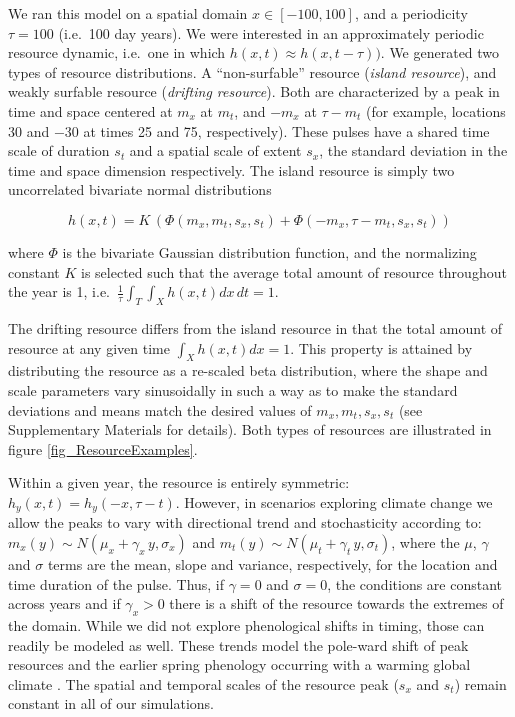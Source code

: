 \documentclass[utf8]{frontiersSCNS} %
\begin{document}
	We ran this model on a spatial domain $x \in [-100,100]$, and a periodicity $\tau = 100$ (i.e.~100 day years). We were interested in an approximately periodic resource dynamic, i.e.~one in which $h(x,t) \approx h(x, t-\tau))$. We generated two types of resource distributions. A ``non-surfable'' resource (\emph{island resource}), and weakly surfable resource (\emph{drifting resource}). Both are characterized by a peak in time and space centered at $m_x$ at $m_t$, and $-m_x$ at $\tau - m_t$ (for example, locations 30 and $-30$ at times 25 and 75, respectively). These pulses have a shared time scale of duration $s_t$ and a spatial scale of extent $s_x$, the standard deviation in the time and space dimension respectively. The island resource is simply two uncorrelated bivariate normal
	distributions 
	
	$$h(x,t) = K\,(\Phi(m_x, m_t, s_x, s_t) + \Phi(-m_x, \tau - m_t, s_x, s_t))$$ 
	
	\noindent where $\Phi$ is the bivariate Gaussian distribution function, and the normalizing constant $K$ is selected such that the average total amount of resource throughout the year is 1, i.e.~$\frac{1}{\tau} \int_T\int_X h(x,t) dx\,dt = 1$.
	
	The drifting resource differs from the island resource in that the total amount of resource at any given time $\int_X h(x,t) dx = 1$. This property is attained by distributing the resource as a re-scaled beta distribution, where the shape and scale parameters vary sinusoidally in such a way as to make the standard deviations and means match the desired values of $m_x, m_t, s_x, s_t$ (see Supplementary Materials for details). Both types of resources are illustrated in figure \ref{fig_ResourceExamples}.
	
	Within a given year, the resource is entirely symmetric: $h_y(x,t) = h_y(-x, \tau-t)$. However, in scenarios exploring climate change we allow the peaks to vary with directional trend and stochasticity according to: $m_x(y) \sim {N}(\mu_x + \gamma_x\,y, \sigma_x)$ and $m_t(y) \sim {N}(\mu_t + \gamma_t\,y, \sigma_t)$, where the $\mu$, $\gamma$ and $\sigma$ terms are the mean, slope and variance, respectively, for the location and time duration of the pulse. Thus, if $\gamma=0$ and $\sigma=0$, the conditions are constant across years and if $\gamma_x > 0$ there is a shift of the resource towards the extremes of the domain. While we did not explore phenological shifts in timing, those can readily be modeled as well. These trends model the pole-ward shift of peak resources and the earlier spring phenology occurring with a warming global climate \citep{Renner2018}. The spatial and temporal scales of the resource peak ($s_x$ and $s_t$) remain constant in all of our simulations. 
	
\end{document}
